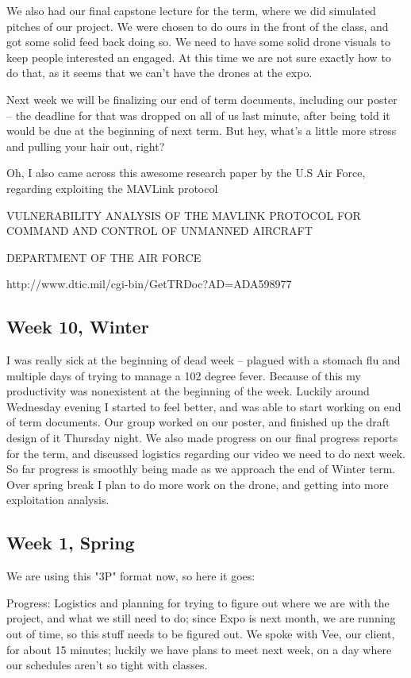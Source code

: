 \documentclass[IEEEtran,letterpaper,10pt,notitlepage,draftclsnofoot,onecolumn]{article}
\begin{document}
We also had our final capstone lecture for the term, where we did simulated pitches of our project. We were chosen to do ours in the front of the class, and got some solid feed back doing so. We need to have some solid drone visuals to keep people interested an engaged. At this time we are not sure exactly how to do that, as it seems that we can't have the drones at the expo.

Next week we will be finalizing our end of term documents, including our poster -- the deadline for that was dropped on all of us last minute, after being told it would be due at the beginning of next term. But hey, what's a little more stress and pulling your hair out, right?

Oh, I also came across this awesome research paper by the U.S Air Force, regarding exploiting the MAVLink protocol

VULNERABILITY ANALYSIS OF THE MAVLINK PROTOCOL FOR COMMAND AND CONTROL OF UNMANNED AIRCRAFT

DEPARTMENT OF THE AIR FORCE

http://www.dtic.mil/cgi-bin/GetTRDoc?AD=ADA598977
\subsection{Week 10, Winter}
I was really sick at the beginning of dead week -- plagued with a stomach flu and multiple days of trying to manage a 102 degree fever. Because of this my productivity was nonexistent at the beginning of the week. Luckily around Wednesday evening I started to feel better, and was able to start working on end of term documents. Our group worked on our poster, and finished up the draft design of it Thursday night. We also made progress on our final progress reports for the term, and discussed logistics regarding our video we need to do next week. So far progress is smoothly being made as we approach the end of Winter term. Over spring break I plan to do more work on the drone, and getting into more exploitation analysis.
\subsection{Week 1, Spring}
We are using this "3P" format now, so here it goes:

Progress: Logistics and planning for trying to figure out where we are with the project, and what we still need to do; since Expo is next month, we are running out of time, so this stuff needs to be figured out. We spoke with Vee, our client, for about 15 minutes; luckily we have plans to meet next week, on a day where our schedules aren't so tight with classes.
\end{document}
